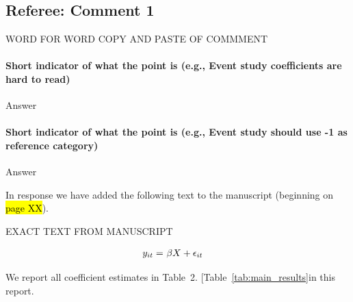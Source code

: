 \documentclass[11pt,leqno]{article}
\begin{document}
\subsection*{Referee: Comment 1} 

\begin{tcolorbox}[left = 1em, top = 1ex, bottom = 1ex, colupper=black, colback=black!10, adjusted title = Referee: Comment 1]
    \setlength\parindent{2em}
	\noindent
	\ttfamily
	
	WORD FOR WORD COPY AND PASTE OF COMMMENT
\end{tcolorbox}


\paragraph{Short indicator of what the point is (e.g., Event study coefficients are hard to read)} Answer 

\paragraph{Short indicator of what the point is (e.g., Event study should use -1 as reference category)} Answer 

In response we have added the following text to the manuscript (beginning on \hl{page XX}).
    
	\begin{tcolorbox}[left = 1em, top = 1ex, bottom = 1ex, colupper=black, colback=white, adjusted title = From page \hl{XX}]
    
       EXACT TEXT FROM MANUSCRIPT
    
        \begin{align}
            y_{it} = &~\beta X + \epsilon_{it} \notag
        \end{align}
        
        We report all coefficient estimates in Table~2. {\color{red} {\ttfamily[Table~\ref{tab:main_results}in this report.}} \\

        {\color{red} {}} \\
    \end{tcolorbox}    
\end{document}
